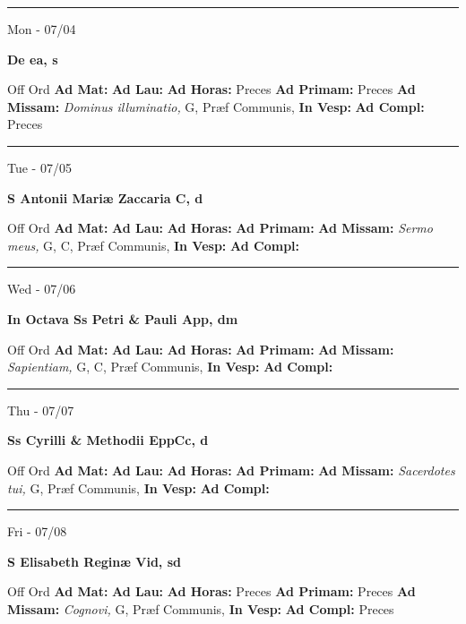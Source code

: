 \documentclass[letterpaper, 10pt]{article}
\begin{document}
\hrule
\begin{center}
Mon - 07/04
\end{center}\textbf{ \large De ea, \textnormal{\normalsize s}}
\begin{justify}
Off Ord
\textbf{Ad Mat: }
\textbf{Ad Lau: }
\textbf{Ad Horas: }Preces
\textbf{Ad Primam: }Preces
\textbf{Ad Missam:} \textit{Dominus illuminatio, } G, Præf Communis, 
\textbf{In Vesp: }
\textbf{Ad Compl: }Preces\end{justify}



\hrule
\begin{center}
Tue - 07/05
\end{center}\textbf{ \large S Antonii Mariæ Zaccaria C, \textnormal{\normalsize d}}
\begin{justify}
Off Ord
\textbf{Ad Mat: }
\textbf{Ad Lau: }
\textbf{Ad Horas: }
\textbf{Ad Primam: }
\textbf{Ad Missam:} \textit{Sermo meus, } G, C, Præf Communis, 
\textbf{In Vesp: }
\textbf{Ad Compl: }\end{justify}



\hrule
\begin{center}
Wed - 07/06
\end{center}\textbf{ \large In Octava Ss Petri \& Pauli App, \textnormal{\normalsize dm}}
\begin{justify}
Off Ord
\textbf{Ad Mat: }
\textbf{Ad Lau: }
\textbf{Ad Horas: }
\textbf{Ad Primam: }
\textbf{Ad Missam:} \textit{Sapientiam, } G, C, Præf Communis, 
\textbf{In Vesp: }
\textbf{Ad Compl: }\end{justify}



\hrule
\begin{center}
Thu - 07/07
\end{center}\textbf{ \large Ss Cyrilli \& Methodii EppCc, \textnormal{\normalsize d}}
\begin{justify}
Off Ord
\textbf{Ad Mat: }
\textbf{Ad Lau: }
\textbf{Ad Horas: }
\textbf{Ad Primam: }
\textbf{Ad Missam:} \textit{Sacerdotes tui, } G, Præf Communis, 
\textbf{In Vesp: }
\textbf{Ad Compl: }\end{justify}



\hrule
\begin{center}
Fri - 07/08
\end{center}\textbf{ \large S Elisabeth Reginæ Vid, \textnormal{\normalsize sd}}
\begin{justify}
Off Ord
\textbf{Ad Mat: }
\textbf{Ad Lau: }
\textbf{Ad Horas: }Preces
\textbf{Ad Primam: }Preces
\textbf{Ad Missam:} \textit{Cognovi, } G, Præf Communis, 
\textbf{In Vesp: }
\textbf{Ad Compl: }Preces\end{justify}
\end{document}
